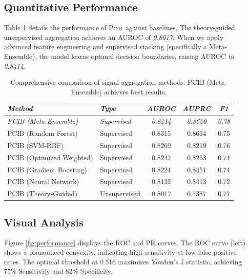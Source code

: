 \documentclass[11pt,letterpaper]{article}
\newcommand{\modelname}{\textsc{Pcib}}
\begin{document}
\subsection{Quantitative Performance}
Table \ref{tab:comparison} details the performance of \modelname\ against baselines. The theory-guided unsupervised aggregation achieves an AUROC of \textit{0.8017}. When we apply advanced feature engineering and supervised stacking (specifically a Meta-Ensemble), the model learns optimal decision boundaries, raising AUROC to \textit{0.8414}.

\begin{table}[h]
\centering
\small
\caption{Comprehensive comparison of signal aggregation methods. PCIB (Meta-Ensemble) achieves best results.}
\label{tab:comparison}
\begin{tabular}{llccc}
\toprule
\textit{Method} & \textit{Type} & \textit{AUROC} & \textit{AUPRC} & \textit{F1} \\
\midrule
\rowcolor{lightgray} \textit{PCIB (Meta-Ensemble)} & \textit{Supervised} & \textit{0.8414} & \textit{0.8620} & \textit{0.78} \\
PCIB (Random Forest) & Supervised & 0.8315 & 0.8634 & 0.75 \\
PCIB (SVM-RBF) & Supervised & 0.8269 & 0.8219 & 0.76 \\
PCIB (Optimized Weighted) & Supervised & 0.8247 & 0.8263 & 0.74 \\
PCIB (Gradient Boosting) & Supervised & 0.8224 & 0.8451 & 0.74 \\
PCIB (Neural Network) & Supervised & 0.8132 & 0.8413 & 0.72 \\
PCIB (Theory-Guided) & Unsupervised & 0.8017 & 0.7387 & 0.77 \\
\bottomrule
\end{tabular}
\end{table}

\subsection{Visual Analysis}
Figure \ref{fig:performance} displays the ROC and PR curves. The ROC curve (left) shows a pronounced convexity, indicating high sensitivity at low false-positive rates. The optimal threshold at 0.516 maximizes Youden's J statistic, achieving 75\% Sensitivity and 82\% Specificity.

\def\roccoords{(0.0000,0.0000) (0.0100,0.0000) (0.0200,0.0200) (0.0300,0.0300) (0.0500,0.0300) (0.0600,0.0400) (0.0600,0.1000) (0.0600,0.1100) (0.0600,0.1400) (0.0700,0.3000) (0.0700,0.3300) (0.0800,0.3400) (0.0800,0.3700) (0.0800,0.3900) (0.0900,0.4300) (0.1000,0.4600) (0.1000,0.4900) (0.1100,0.5100) (0.1100,0.5600) (0.1100,0.5800) (0.1200,0.5900) (0.1400,0.6000) (0.1400,0.6700) (0.1500,0.7200) (0.1600,0.7300) (0.1700,0.7300) (0.1800,0.7400) (0.1900,0.7500) (0.1900,0.7600) (0.2500,0.7700) (0.2700,0.7900) (0.2900,0.7900) (0.3400,0.8000) (0.3500,0.8100) (0.3500,0.8300) (0.3600,0.8500) (0.4000,0.8600) (0.4900,0.8600) (0.5300,0.8700) (0.5500,0.8900) (0.5500,0.9100) (0.5700,0.9200) (0.6100,0.9300) (0.7000,0.9300) (0.8300,0.9600) (0.8700,0.9700) (0.8700,0.9800) (0.9300,0.9800) (0.9900,0.9900) (1.0000,1.0000)}
\end{document}
